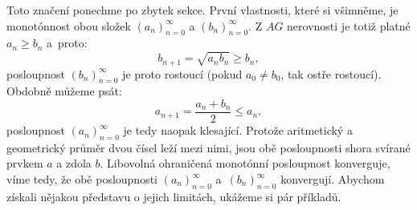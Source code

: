\documentclass[12pt]{report}
\begin{document}
Toto značení ponechme po zbytek sekce. První vlastnosti, které si všimněme, je monotónnost obou složek $(a_n)_{n=0}^{\infty}$ a $(b_n)_{n=0}^{\infty}$. Z $AG$ nerovnosti je totiž platné $a_n \geqslant b_n$ a~proto:
$$ b_{n+1} = \sqrt{a_n b_n} \geqslant b_n,$$
posloupnost $(b_n)_{n=0}^{\infty}$ je proto rostoucí (pokud $a_0 \neq b_0$, tak ostře rostoucí). Obdobně  můžeme psát:
$$a_{n+1} = \frac{a_n+b_n}{2} \leqslant a_n,$$
posloupnost $(a_n)_{n=0}^{\infty}$ je tedy naopak klesající. Protože aritmetický a geometrický průměr dvou čísel leží mezi nimi, jsou obě posloupnosti shora svírané prvkem $a$ a zdola $b$. Libovolná ohraničená monotónní posloupnost konverguje, víme tedy, že obě posloupnosti $(a_n)_{n=0}^{\infty}$ a~$(b_n)_{n=0}^{\infty}$ konvergují. Abychom získali nějakou představu o jejich limitách, ukážeme si pár příkladů.
\end{document}
